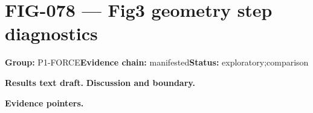 \clearpage
\section{FIG-078 --- Fig3 geometry step diagnostics}
\label{figpage:fig-078}
\textbf{Group:} P1-FORCE\quad \textbf{Evidence chain:} manifested\quad \textbf{Status:} exploratory;comparison

\textbf{Results text draft.} 
\textbf{Discussion and boundary.} 


\textbf{Evidence pointers.}



\vfill
